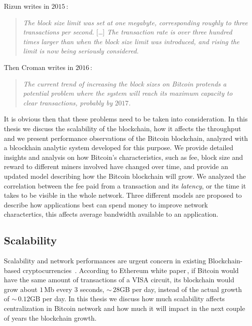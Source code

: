 \documentclass[USenglish]{uit-thesis}
\begin{document}
Rizun writes in $2015$\,\cite{Rizun:2015:blocksizelimit}:
\begin{quote}
	\emph{The block size limit was set at one megabyte, corresponding
		roughly to three transactions per second.}
		[\dots]
		\emph{The transaction rate is over three hundred times larger
		than when the block size limit was introduced, and rising the limit
		is now being seriously considered.}
\end{quote}
Then Croman writes in $2016$\,\cite{croman2016}:
\begin{quote}
\emph{The current trend of increasing the block sizes on Bitcoin protends
a potential problem where the system will reach its maximum capacity to clear
transactions, probably by $2017$.}
\end{quote}

It is obvious then that these problems need to be taken
into consideration.
In this thesis we discuss the scalability of the blockchain, how it affects
the throughput and we present performance observations of the
Bitcoin blockchain, analyzed with a blcockhain analytic system developed
for this purpose. We provide detailed insights and analysis on how
Bitcoin's characteristics, such as fee, block size and reward to different
miners involved have changed over time, and provide an
updated model describing how the Bitcoin blockchain will grow. 
We analyzed the correlation between the fee paid from a transaction
and its \emph{latency}, or the time it takes to 
be visible in the whole network.
Three different models are proposed to describe how applications
best can spend money to improve network charactertics,
this affects average bandwidth available to an application. 

\subsection{Scalability}
\label{sec:prob_stat_scalability}
Scalability and network performances are urgent
concern in existing Blockchain-based
cryptocurrencies~\cite{croman2016}.
According to Ethereum white paper\,\cite{ethereum_white_paper},
if Bitcoin would have the same amount of transactions
of a VISA circuit, its blockchain would grow
about $1$\,Mb every $3$ seconds, $\sim$\,$28$GB per day,
instead of the actual growth of $\sim$\,$0.12$GB per day.
In this thesis we discuss how much scalability affects
centralization in Bitcoin network and how much it will
impact in the next couple of years the blockchain
growth.
\end{document}

